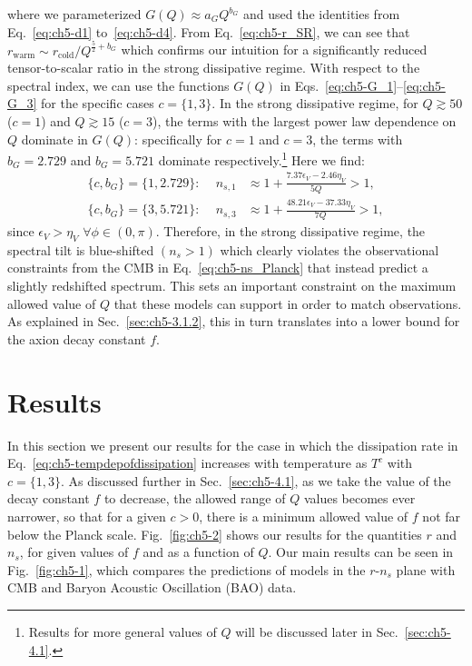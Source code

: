 where we parameterized $G(Q)\approx a_G Q^{b_G}$ and used the identities from Eq.~\ref{eq:ch5-d1} to~\ref{eq:ch5-d4}. From Eq.~\ref{eq:ch5-r_SR}, we can see that $r_{\mathrm{warm}}\sim r_{\mathrm{cold}}/ Q^{\frac{5}{2}+b_G}$ which confirms our intuition for a significantly reduced tensor-to-scalar ratio in the strong dissipative regime. With respect to the spectral index, we can use the functions $G(Q)$ in Eqs.~\ref{eq:ch5-G_1}--\ref{eq:ch5-G_3} for the specific cases $c=\{1,3\}$. In the strong dissipative regime, for $Q\gtrsim50$ ($c=1$) and $Q\gtrsim 15$ ($c=3$), the terms with the largest power law dependence on $Q$ dominate in $G(Q)$:  specifically for $c=1$ and $c=3$, the terms with $b_G = 2.729$ and $b_G=5.721$ dominate respectively.\footnote{Results for more general values of $Q$ will be discussed later in Sec.~\ref{sec:ch5-4.1}.} Here we find:
\begin{align}
    \text{$\{c,b_G\}=\{1,2.729\}$: } \quad n_{s,1}&\approx 1+ \frac{7.37\epsilon_V-2.46\eta_V}{5Q}> 1, \label{eq:ch5-ns.SR1}\\
    \text{$\{c,b_G\}=\{3,5.721\}$: } \quad n_{s,3}&\approx 1+ \frac{48.21\epsilon_V-37.33\eta_V}{7Q}> 1, \label{eq:ch5-ns.SR3}
\end{align}
since $\epsilon_V>\eta_V$ $\forall \phi\in(0,\pi)$. Therefore, in the strong dissipative regime, the spectral tilt is blue-shifted $(n_s>1)$ which clearly violates the observational constraints from the CMB in Eq.~\ref{eq:ch5-ns_Planck} that instead predict a slightly redshifted spectrum. This sets an important constraint on the maximum allowed value of $Q$ that these models can support in order to match observations. As explained in Sec.~\ref{sec:ch5-3.1.2}, this in turn translates into a lower bound for the axion decay constant $f$.

\section{Results \label{sec:ch5-results}}

In this section we present our results for the case in which the dissipation rate in Eq.~\ref{eq:ch5-tempdepofdissipation} increases with temperature as $T^c$ with $c=\{1,3\}$.  As discussed further in Sec.~\ref{sec:ch5-4.1}, as we take the value of the decay constant $f$ to decrease, the allowed range of $Q$ values becomes ever narrower, so that for a given $c>0$, there is a minimum allowed value of $f$ not far below the Planck scale. Fig.~\ref{fig:ch5-2} shows our results for the quantities $r$ and $n_s$, for given values of $f$ and as a function of $Q$. Our main results can be seen in Fig.~\ref{fig:ch5-1}, which compares the predictions of models in the $r$-$n_s$ plane with CMB and Baryon Acoustic Oscillation (BAO) data.

